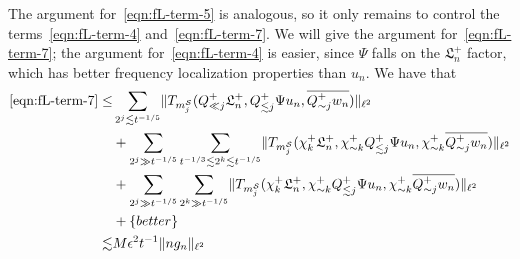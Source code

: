 \documentclass[letterpaper, reqno,final]{amsart}
\newcommand{\cS}{\mathcal{S}}
\newcommand{\fL}{\mathfrak{L}}
\newcommand{\btext}[1]{\left\{\textup{#1}\right\}}
\newcommand{\bbetter}{\btext{better}}
\begin{document}
The argument for~\eqref{eqn:fL-term-5} is analogous, so it only remains to control the terms~\eqref{eqn:fL-term-4} and~\eqref{eqn:fL-term-7}.  We will give the argument for~\eqref{eqn:fL-term-7}; the argument for~\eqref{eqn:fL-term-4} is easier, since $\Psi$ falls on the $\fL_n^+$ factor, which has better frequency localization properties than $u_n$.  We have that
\begin{equation*}\begin{split}
    \eqref{eqn:fL-term-7} \leq& \sum_{2^j \lesssim t^{-1/5}} \lVert T_{m_j^\cS}(Q_{\ll j}^+ \fL_n^+, Q_{\lesssim j}^+ \Psi u_n, \overline{Q_{\sim j}^+ w_n}) \rVert_{\ell^2}\\
    &+ \sum_{2^j \gg t^{-1/5}} \sum_{t^{-1/3} \lesssim 2^k \lesssim t^{-1/5}} \lVert T_{m_j^\cS}(\chi_k^+ \fL_n^+, \chi_{\sim k}^+Q_{\lesssim j}^+ \Psi u_n, \chi_{\sim k}^+\overline{Q_{\sim j}^+ w_n}) \rVert_{\ell^2}\\
    &+ \sum_{2^j \gg t^{-1/5}} \sum_{2^k \gg t^{-1/5}} \lVert T_{m_j^\cS}(\chi_k^+ \fL_n^+, \chi_{\sim k}^+Q_{\lesssim j}^+ \Psi u_n, \chi_{\sim k}^+\overline{Q_{\sim j}^+ w_n}) \rVert_{\ell^2}\\
    &+ \bbetter\\
    \lesssim& M\epsilon^2 t^{-1} \lVert ng_n \rVert_{\ell^2}
\end{split}
\end{equation*}
\end{document}
